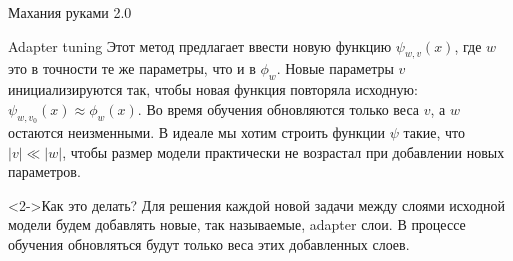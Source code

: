 \documentclass[9pt]{beamer}
\begin{document}
\begin{frame}{Махания руками 2.0}
    
    \begin{block}{Adapter tuning}
        Этот метод предлагает ввести новую функцию $\psi_{w, v}(x)$, где $w$ это в точности те же параметры, что и в $\phi_w$. Новые параметры $v$ инициализируются так, чтобы новая функция повторяла исходную: $\psi_{w, v_0}(x) \approx \phi_w(x)$. Во время обучения обновляются только веса $v$, а $w$ остаются неизменными. В идеале мы хотим строить функции $\psi$ такие, что $|v| \ll |w|$, чтобы размер модели практически не возрастал при добавлении новых параметров.
    \end{block}

    \begin{block}<2->{Как это делать?}
        Для решения каждой новой задачи между слоями исходной модели будем добавлять новые, так называемые, adapter слои. В процессе обучения обновляться будут только веса этих добавленных слоев.
    \end{block}

\end{frame}
\end{document}
